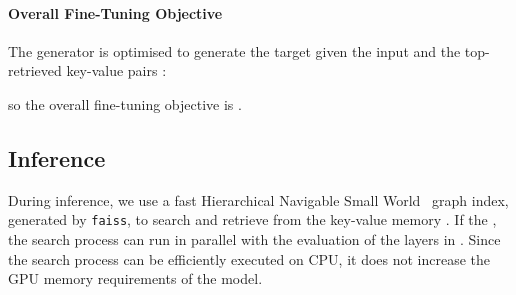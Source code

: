 \paragraph{Overall Fine-Tuning Objective}
The generator is optimised to generate the target  given the input  and the top- retrieved key-value pairs :

so the overall fine-tuning objective is .

\subsection{Inference} \label{sec:inference}

During inference, we use a fast Hierarchical Navigable Small World~\citep[HNSW,][]{DBLP:journals/pami/MalkovY20} graph index, generated by \texttt{faiss}, to search and retrieve from the key-value memory .
If the , the search process can run in parallel with the evaluation of the layers  in \ModelName.
Since the search process can be efficiently executed on CPU, it does not increase the GPU memory requirements of the model.


